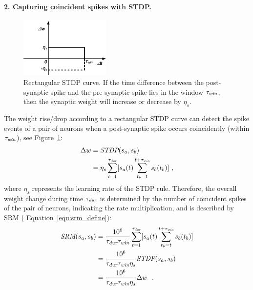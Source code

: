 \paragraph{2. Capturing coincident spikes with STDP.\\}
\begin{figure}
	\centering
	\includegraphics[width=0.4\textwidth]{pics_sdlm/stdp.png}
	\caption[Rectangular STDP curve.]{Rectangular STDP curve.
		If the time difference between the post-synaptic spike and the pre-synaptic spike lies in the window $\tau_{\textit{\textrm{win}}}$, then the synaptic weight will increase or decrease by $\eta_s$.}
	\label{fig:rtg_stdp}
\end{figure}
The weight rise/drop according to a rectangular STDP curve can detect the spike events of a pair of neurons when a post-synaptic spike occurs coincidently (within $\tau_{\textit{\textrm{win}}}$), see Figure~\ref{fig:rtg_stdp}:
\begin{equation}
\begin{aligned}
\Delta w &= \textit{\textrm{STDP}}(s_a, s_b)\\
&= \eta_s \sum_{t=1}^{\tau_{\textit{\textrm{dur}}}} [s_a(t) \sum_{t_b=t}^{t+\tau_{\textit{\textrm{win}}}} s_b(t_b)]~,
\end{aligned}
\end{equation}
where $ \eta_s$ represents the learning rate of the STDP rule.
Therefore, the overall weight change during time $\tau_{\textit{\textrm{dur}}}$ is determined by the number of coincident spikes of the pair of neurons, indicating the rate multiplication, and is described by SRM ( Equation~\ref{equ:srm_define}):
\begin{equation}
\begin{aligned}
\textit{\textrm{SRM}}(s_a, s_b) %
&= \frac{10^6}{\tau_{\textit{\textrm{dur}}} \tau_{\textit{\textrm{win}}}} \sum_{t=1}^{\tau_{\textit{\textrm{dur}}}} [s_a(t) \sum_{t_b=t}^{t+\tau_{\textit{\textrm{win}}}} s_b(t_b)]\\
&= \frac{10^6}{\tau_{\textit{\textrm{dur}}}
\tau_{\textit{\textrm{win}}}
\eta_s}
\textit{\textrm{STDP}}(s_a, s_b)\\  %
&= \frac{10^6}{\tau_{\textit{\textrm{dur}}}
\tau_{\textit{\textrm{win}}}
\eta_s}
\Delta w~~.
\end{aligned}
\end{equation}
